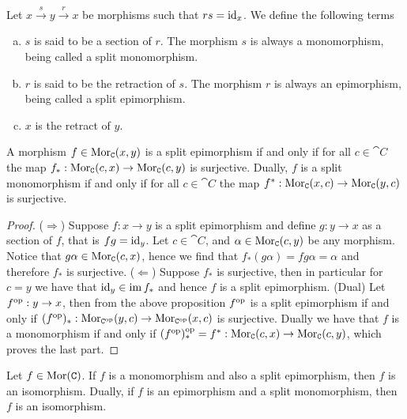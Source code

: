 \begin{definition}
    Let \(x \xrightarrow s y \xrightarrow r x\) be morphisms such that \(r s =
    \operatorname{id}_x\). We define the following terms
    \begin{enumerate}[(a)]\setlength\itemsep{0em}
        \item\label{def: split monomorphism}
        \(s\) is said to be a section of \(r\). The morphism \(s\) is always a
        monomorphism, being called a split monomorphism.
        \item\label{def: split epimorphism}
        \(r\) is said to be the retraction of \(s\). The morphism \(r\) is always
        an epimorphism, being called a split epimorphism.
        \item\label{def: retract}
        \(x\) is the retract of \(y\).
    \end{enumerate}
\end{definition}

\begin{proposition}
    A morphism \(f \in \operatorname{Mor}_{\texttt C}(x, y)\) is a split epimorphism if and only if
    for all \(c \in \cat C\) the map \(f_*: \operatorname{Mor}_{\texttt C}(c, x) \to \operatorname{Mor}_{\texttt
        C}(c, y)\) is surjective. Dually, \(f\) is a split monomorphism if and only
    if for all \(c \in \cat C\) the map \(f^*: \operatorname{Mor}_{\texttt C}(x, c) \to
    \operatorname{Mor}_{\texttt C}(y, c)\) is surjective.
\end{proposition}

\begin{proof}
    (\(\Rightarrow\)) Suppose \(f: x \to y\) is a split epimorphism and define
    \(g: y \to x\) as a section of \(f\), that is \(f g = \operatorname{id}_y\). Let \(c
    \in \cat C\), and \(\alpha \in \operatorname{Mor}_{\texttt C}(c, y)\) be any morphism. Notice
    that \(g \alpha \in \operatorname{Mor}_{\texttt C}(c, x)\), hence we find that \(f_*(g
    \alpha) = f g \alpha = \alpha\) and therefore \(f_*\) is
    surjective. (\(\Leftarrow\)) Suppose \(f_*\) is surjective, then in particular
    for \(c = y\) we have that \(\operatorname{id}_y \in \operatorname{im} f_*\) and hence \(f\) is a split
    epimorphism. (Dual) Let \(f^{\mathrm{op}}: y \to x\), then from the above proposition
    \(f^{\mathrm{op}}\) is a split epimorphism if and only if \((f^{\mathrm{op}})_*: \operatorname{Mor}_{\texttt
        C^{\mathrm{op}}}(y, c) \to \operatorname{Mor}_{\texttt C^{\mathrm{op}}}(x, c)\) is surjective. Dually we have that
    \(f\) is a monomorphism if and only if \((f^{\mathrm{op}})_*^{\mathrm{op}} = f^*: \operatorname{Mor}_{\texttt C}(c,
    x) \to \operatorname{Mor}_{\texttt C}(c, y)\), which proves the last part.
\end{proof}

\begin{proposition}
    Let \(f \in \operatorname{Mor}(\texttt C)\). If \(f\) is a monomorphism and also a split
    epimorphism, then \(f\) is an isomorphism. Dually, if \(f\) is an epimorphism
    and a split monomorphism, then \(f\) is an isomorphism.
\end{proposition}

